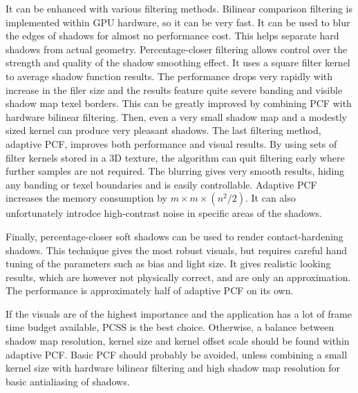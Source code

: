 It can be enhanced with various filtering methods. Bilinear comparison filtering is implemented within GPU hardware, so it can be very fast. It can be used to blur the edges of shadows for almost no performance cost. This helps separate hard shadows from actual geometry. Percentage-closer filtering allows control over the strength and quality of the shadow smoothing effect. It uses a square filter kernel to average shadow function results. The performance drops very rapidly with increase in the filer size and the results feature quite severe banding and visible shadow map texel borders. This can be greatly improved by combining PCF with hardware bilinear filtering. Then, even a very small shadow map and a modestly sized kernel can produce very pleasant shadows. The last filtering method, adaptive PCF, improves both performance and visual results. By using sets of filter kernels stored in a 3D texture, the algorithm can quit filtering early where further samples are not required. The blurring gives very smooth results, hiding any banding or texel boundaries and is easily controllable. Adaptive PCF increases the memory consumption by \(m\times m\times (n^2 / 2)\). It can also unfortunately introdce high-contrast noise in specific areas of the shadows.

Finally, percentage-closer soft shadows can be used to render contact-hardening shadows. This technique gives the most robust visuals, but requires careful hand tuning of the parameters such as bias and light size. It gives realistic looking results, which are however not physically correct, and are only an approximation. The performance is approximately half of adaptive PCF on its own.

If the visuals are of the highest importance and the application has a lot of frame time budget available, PCSS is the best choice. Otherwise, a balance between shadow map resolution, kernel size and kernel offset scale should be found within adaptive PCF. Basic PCF should probably be avoided, unless combining a small kernel size with hardware bilinear filtering and high shadow map resolution for basic antialiasing of shadows.

